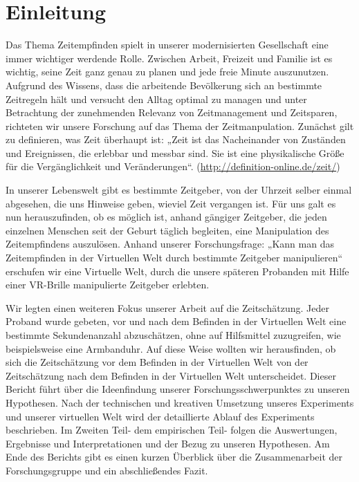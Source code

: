 \documentclass{Bericht}
\begin{document}
\maketitle


\tableofcontents
\clearpage

\section{Einleitung} %
	Das Thema Zeitempfinden spielt in unserer modernisierten Gesellschaft eine immer wichtiger werdende Rolle. Zwischen Arbeit, Freizeit und Familie ist es wichtig, seine Zeit ganz genau zu planen und jede freie Minute auszunutzen. Aufgrund des Wissens, dass die arbeitende Bevölkerung sich an bestimmte Zeitregeln hält und versucht den Alltag optimal zu managen und unter Betrachtung der zunehmenden Relevanz von Zeitmanagement und Zeitsparen, richteten wir unsere Forschung auf das Thema der Zeitmanpulation. Zunächst gilt zu definieren, was Zeit überhaupt ist: „Zeit ist das Nacheinander von Zuständen und Ereignissen, die erlebbar und messbar sind. Sie ist eine physikalische Größe für die Vergänglichkeit und Veränderungen“. (\underline{http://definition-online.de/zeit/})

	In unserer Lebenswelt gibt es bestimmte Zeitgeber, von der Uhrzeit selber einmal abgesehen, die uns Hinweise geben, wieviel Zeit vergangen ist. Für uns galt es nun herauszufinden, ob es möglich ist, anhand gängiger Zeitgeber, die jeden einzelnen Menschen seit der Geburt täglich begleiten, eine Manipulation des Zeitempfindens auszulösen. Anhand unserer Forschungsfrage: „Kann man das Zeitempfinden in der Virtuellen Welt durch bestimmte Zeitgeber manipulieren“ erschufen wir eine Virtuelle Welt, durch die unsere späteren Probanden mit Hilfe einer VR-Brille manipulierte Zeitgeber erlebten. 

	 Wir legten einen weiteren Fokus unserer Arbeit auf die Zeitschätzung. Jeder Proband wurde gebeten, vor und nach dem Befinden in der Virtuellen Welt eine bestimmte Sekundenanzahl abzuschätzen, ohne auf Hilfsmittel zuzugreifen, wie beispielsweise eine Armbanduhr. Auf diese Weise wollten wir herausfinden, ob sich die Zeitschätzung vor dem Befinden in der Virtuellen Welt von der Zeitschätzung nach dem Befinden in der Virtuellen Welt unterscheidet.
Dieser Bericht führt über die Ideenfindung unserer Forschungsschwerpunktes zu unseren Hypothesen. Nach der technischen und kreativen Umsetzung unseres Experiments und unserer virtuellen Welt wird der detaillierte Ablauf des Experiments beschrieben. Im Zweiten Teil- dem empirischen Teil- folgen die Auswertungen, Ergebnisse und Interpretationen und der Bezug zu unseren Hypothesen. Am Ende des Berichts gibt es einen kurzen Überblick über die Zusammenarbeit der Forschungsgruppe und ein abschließendes Fazit. 
\end{document}
